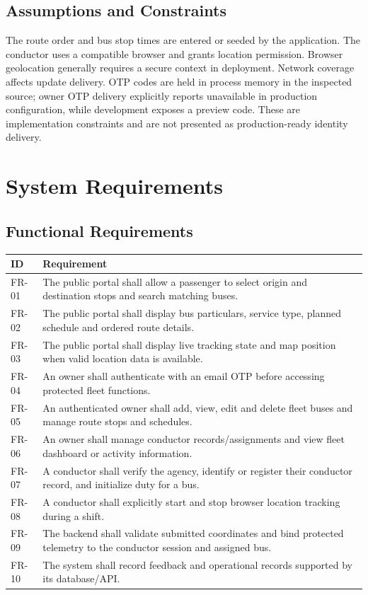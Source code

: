 \documentclass[12pt,a4paper]{report}
\begin{document}
\section{Assumptions and Constraints}
The route order and bus stop times are entered or seeded by the application. The conductor uses a compatible browser and grants location permission. Browser geolocation generally requires a secure context in deployment. Network coverage affects update delivery. OTP codes are held in process memory in the inspected source; owner OTP delivery explicitly reports unavailable in production configuration, while development exposes a preview code. These are implementation constraints and are not presented as production-ready identity delivery.

\chapter{System Requirements}
\section{Functional Requirements}
\begin{longtable}{p{}p{}}
\toprule\textbf{ID}&\textbf{Requirement}\\\midrule
FR-01&The public portal shall allow a passenger to select origin and destination stops and search matching buses.\\
FR-02&The public portal shall display bus particulars, service type, planned schedule and ordered route details.\\
FR-03&The public portal shall display live tracking state and map position when valid location data is available.\\
FR-04&An owner shall authenticate with an email OTP before accessing protected fleet functions.\\
FR-05&An authenticated owner shall add, view, edit and delete fleet buses and manage route stops and schedules.\\
FR-06&An owner shall manage conductor records/assignments and view fleet dashboard or activity information.\\
FR-07&A conductor shall verify the agency, identify or register their conductor record, and initialize duty for a bus.\\
FR-08&A conductor shall explicitly start and stop browser location tracking during a shift.\\
FR-09&The backend shall validate submitted coordinates and bind protected telemetry to the conductor session and assigned bus.\\
FR-10&The system shall record feedback and operational records supported by its database/API.\\
\bottomrule
\end{longtable}
\end{document}
